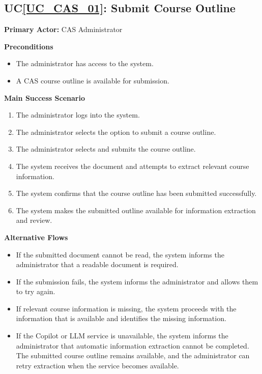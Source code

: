 \documentclass[12pt]{article}
\newcounter{ucnum} %
\newcommand{\ucref}[1]{UC\ref{#1}}
\begin{document}
 \label{UC_CAS_01}
\subsection{\ucref{UC_CAS_01}: Submit Course Outline}

\noindent \textbf{Primary Actor:} CAS Administrator

\noindent \textbf{Preconditions}
\begin{itemize}
  \item The administrator has access to the system.
  \item A CAS course outline is available for submission.
\end{itemize}

\noindent \textbf{Main Success Scenario}
\begin{enumerate}
  \item The administrator logs into the system.
  \item The administrator selects the option to submit a course outline.
  \item The administrator selects and submits the course outline.
  \item The system receives the document and attempts to extract relevant course information.
  \item The system confirms that the course outline has been submitted successfully.
  \item The system makes the submitted outline available for information extraction and review.
\end{enumerate}

\noindent \textbf{Alternative Flows}
\begin{itemize}
  \item If the submitted document cannot be read, the system informs the administrator that a readable document is required.
  \item If the submission fails, the system informs the administrator and allows them to try again.
  \item If relevant course information is missing, the system proceeds with the information that is available and identifies the missing information.
  \item If the Copilot or LLM service is unavailable, the system informs the administrator that automatic information extraction cannot be completed. The submitted course outline remains available, and the administrator can retry extraction when the service becomes available.
\end{itemize}
\end{document}

